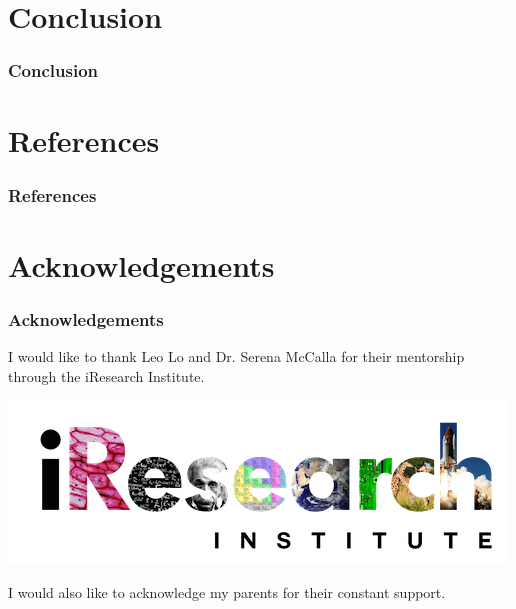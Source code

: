 \documentclass[12pt]{beamer}
\begin{document}
\section{Conclusion}

\begin{frame}
\frametitle{Conclusion}


\end{frame}

\section{References}
\begin{frame}
\frametitle{References}
\end{frame}


\section{Acknowledgements}


\begin{frame}
\frametitle{Acknowledgements}
I would like to thank Leo Lo and Dr. Serena McCalla for their mentorship through the iResearch Institute.

\begin{center}
\includegraphics[scale = 0.58]{iresearch.png}
\end{center}

I would also like to acknowledge my parents for their constant support.

\end{frame}
\end{document}
